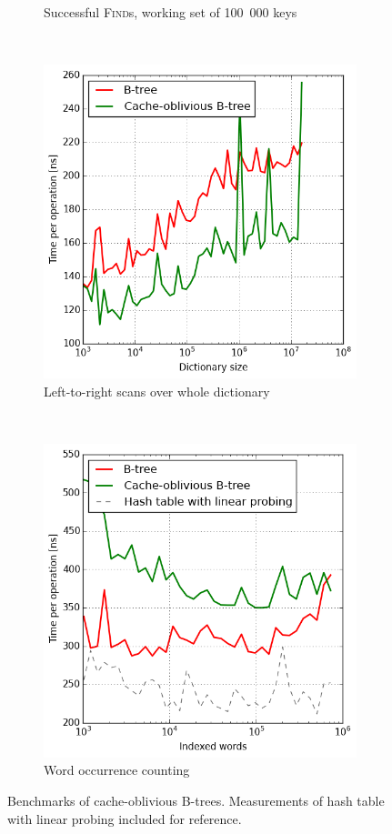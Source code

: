 \begin{figure}
\begin{subfigure}[t]{0.45\textwidth}
	\caption{Successful \textsc{Find}s, working set of 100~000 keys}
\end{subfigure}
~
\begin{subfigure}[t]{0.45\textwidth}
	\includegraphics[width=\textwidth]{img/performance/cob-performance-5}
	\caption{Left-to-right scans over whole dictionary}
\end{subfigure}
~
\begin{subfigure}[t]{0.45\textwidth}
	\includegraphics[width=\textwidth]{img/performance/cob-performance-6}
	\caption{Word occurrence counting}
\end{subfigure}
\caption{Benchmarks of cache-oblivious B-trees.
	Measurements of hash table with linear probing included for reference.}
\label{fig:cob-performance}
\end{figure}

